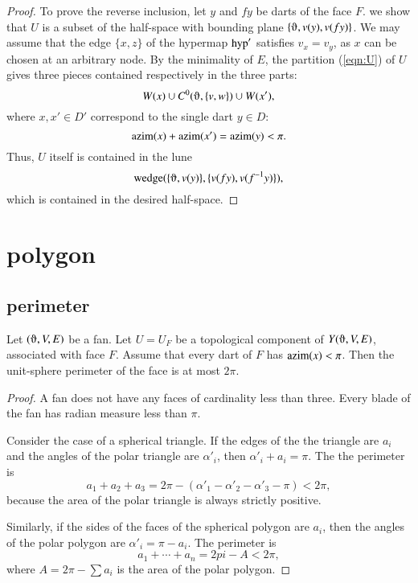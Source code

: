 \begin{proof}
To prove the reverse inclusion, let $y$ and $f y$ be darts of
the face $F$.  we show that $U$ is a subset of the half-space with bounding
plane $\{\orgn,v(y),v(f y)\}$.  We may assume that the edge $\{x,z\}$ of the
hypermap ${\operatorname{hyp}}'$ satisfies $v_x = v_y$, as $x$ can be chosen at an
arbitrary node.  By the minimality of $E$,  
the partition (\ref{eqn:U}) of $U$ gives three pieces
contained respectively in the three parts:
$$
W(x) \cup C^0(\orgn,\{v,w\}) \cup W(x'),
$$
where $x,x'\in D'$ correspond to the single dart $y\in D$:
$$
{\operatorname{azim}}(x) + {\operatorname{azim}}(x') = {\operatorname{azim}}(y) < \pi.
$$
Thus, $U$ itself is contained in the lune
$$
\op{wedge}(\{\orgn,v(y)\},\{v(f y),v(f^{-1} y)\}),
$$
which is contained in the desired half-space.
\end{proof}

\section{polygon}


\subsection{perimeter}


\begin{lemma}
Let $(\orgn,V,E)$ be a fan.  
Let $U=U_F$ be a topological component of $Y(\orgn,V,E)$, associated
with face $F$.
Assume
that every dart of $F$ has ${\operatorname{azim}}(x)<\pi$. 
Then the unit-sphere perimeter of the face is at most $2\pi$.
\end{lemma}

\begin{proof}  A fan does not have any faces of cardinality less than three.
Every blade of the fan has radian measure less than $\pi$.  

Consider the case of a spherical triangle.  If the edges of the
the triangle are $a_i$ and the angles of the polar
triangle are $\alpha'_i$, then $\alpha'_i+a_i=\pi$.
The the perimeter is 
$$a_1+a_2+a_3 = 2\pi - (\alpha'_1 -\alpha'_2 - \alpha'_3-\pi) < 2\pi,$$
because the area of the polar triangle is always strictly positive.

Similarly, if the sides of the faces of the spherical polygon are
$a_i$, then the angles of the polar polygon are $\alpha'_i = \pi-a_i$.
The perimeter is
$$
a_1+\cdots+a_n  = 2pi- A< 2\pi,
$$
where $A = 2\pi-\sum a_i$ is the area of the polar polygon.
\end{proof}

